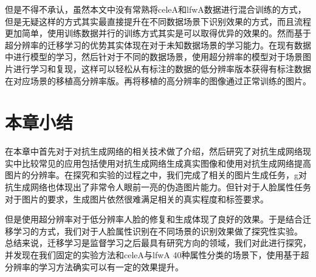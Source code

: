 但是不得不承认，虽然本文中没有常熟将celeA和lfwA数据进行混合训练的方式，但是无疑这样的方式其实最直接提升在不同数据场景下识别效果的方式，而且流程更加简单，使用训练数据并行的训练方式其实是可以取得优异的效果的。然而基于超分辨率的迁移学习的优势其实体现在对于未知数据场景的学习能力。在现有数据中进行模型的学习，然后针对于不同的数据场景，使用超分辨率的模型对于场景图片进行学习和复现，这样可以轻松从有标注的数据的低分辨率版本获得有标注数据在对应场景的移植高分辨率版。再将移植的高分辨率的图像通过正常训练的图片。

\section{本章小结}
在本章中首先对于对抗生成网络的相关技术做了介绍，然后研究了对抗生成网络现实中比较常见的应用包括使用对抗生成网络生成真实图像和使用对抗生成网络提高图片的分辨率。在探究和实验的过程之中，我们完成了相关的图片生成任务，g对抗生成网络也体现出了非常令人眼前一亮的伪造图片能力。但针对于人脸属性任务对于图片的要求，生成图片依然很难满足相关的真实程度和标签要求。

但是使用超分辨率对于低分辨率人脸的修复和生成体现了良好的效果。于是结合迁移学习的方式，我们对于人脸属性识别在不同场景的识别效果做了探究性实验。
总结来说，迁移学习是监督学习之后最具有研究方向的领域，我们对此进行探究，并发现在我们固定的实验方法和celeA与lfwA 40种属性分类的场景下，使用基于超分辨率的学习方法确实可以有一定的效果提升。